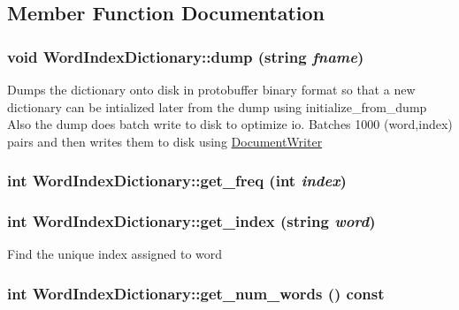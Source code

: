 \subsection{Member Function Documentation}
\hypertarget{class_word_index_dictionary_a5263558f64f5890577e795ccd2834a5b}{
\subsubsection[{dump}]{\setlength{\rightskip}{0pt plus 5cm}void WordIndexDictionary::dump (string {\em fname})}}
\label{class_word_index_dictionary_a5263558f64f5890577e795ccd2834a5b}
Dumps the dictionary onto disk in protobuffer binary format so that a new dictionary can be intialized later from the dump using initialize\_\-from\_\-dump Also the dump does batch write to disk to optimize io. Batches 1000 (word,index) pairs and then writes them to disk using \hyperlink{class_document_writer}{DocumentWriter} \hypertarget{class_word_index_dictionary_af81362ed63cf02ef2722ff3087e01ac8}{
\subsubsection[{get\_\-freq}]{\setlength{\rightskip}{0pt plus 5cm}int WordIndexDictionary::get\_\-freq (int {\em index})}}
\label{class_word_index_dictionary_af81362ed63cf02ef2722ff3087e01ac8}
\hypertarget{class_word_index_dictionary_a683dcfdc3714b73402a3e331db88e33a}{
\subsubsection[{get\_\-index}]{\setlength{\rightskip}{0pt plus 5cm}int WordIndexDictionary::get\_\-index (string {\em word})}}
\label{class_word_index_dictionary_a683dcfdc3714b73402a3e331db88e33a}
Find the unique index assigned to word \hypertarget{class_word_index_dictionary_aa4e879ad400d0b35a5fbfb358d3bf8e2}{
\subsubsection[{get\_\-num\_\-words}]{\setlength{\rightskip}{0pt plus 5cm}int WordIndexDictionary::get\_\-num\_\-words () const}}
